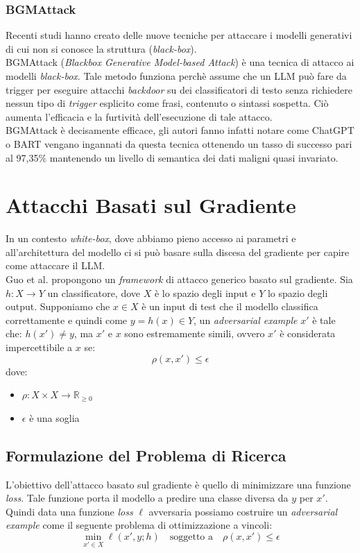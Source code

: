 \subsubsection{BGMAttack} 
Recenti studi \cite{li2023chatgptattacktoolstealthy} hanno creato delle nuove tecniche per attaccare i modelli generativi di cui non si conosce la struttura (\emph{black-box}).\\
BGMAttack (\emph{Blackbox Generative Model-based
Attack}) \cite{li2023chatgptattacktoolstealthy} \`e una tecnica di attacco ai modelli \emph{black-box}. Tale metodo funziona perch\`e assume che un LLM pu\`o fare da trigger per eseguire attacchi \emph{backdoor} su dei classificatori di testo senza richiedere nessun tipo di \emph{trigger} esplicito come frasi, contenuto o sintassi sospetta. Ci\`o aumenta l'efficacia e la furtivit\`a dell'esecuzione di tale attacco.\\
BGMAttack \`e decisamente efficace, gli autori fanno infatti notare come ChatGPT o BART vengano ingannati da questa tecnica ottenendo un tasso di successo pari al 97,35\% mantenendo un livello di semantica dei dati maligni quasi invariato.

\section{Attacchi Basati sul Gradiente}
In un contesto \emph{white-box}, dove abbiamo pieno accesso ai parametri e all'architettura del modello ci si pu\`o basare sulla discesa del gradiente per capire come attaccare il LLM.\\
Guo et al. \cite{guo2021gradientbasedadversarialattackstext} propongono un \emph{framework} di attacco generico basato sul gradiente. Sia \(h:X\rightarrow Y\) un classificatore, dove \(X\) \`e lo spazio degli input e \(Y\) lo spazio degli output. Supponiamo che \(x \in X\) \`e un input di test che il modello classifica correttamente e quindi come \(y=h(x)\in Y\), un \emph{adversarial example} \(x'\) \`e tale che: \(h(x')\neq y\), ma \(x'\) e \(x\) sono estremamente simili, ovvero  \(x'\) \`e considerata impercettibile a \(x\) se:
\[\rho(x,x')\leq \epsilon\]
dove:
\begin{itemize}
    \item \(\rho:X\times X\rightarrow \mathbb{R}_{\geq 0} \)
    \item \(\epsilon\) \`e una soglia
\end{itemize}

\subsection{Formulazione del Problema di Ricerca}
L'obiettivo dell'attacco basato sul gradiente \`e quello di minimizzare una funzione \emph{loss}. Tale funzione porta il modello a predire una classe diversa da \(y\) per \(x'\). Quindi data una funzione \emph{loss} \(\mathcal{\ell}\) avversaria possiamo costruire un \emph{adversarial example} come il seguente problema di ottimizzazione a vincoli:
\begin{equation}
\min_{x' \in X} \mathcal{\ell}(x', y; h) \quad \text{soggetto a} \quad \rho(x, x') \leq \epsilon
\end{equation}

